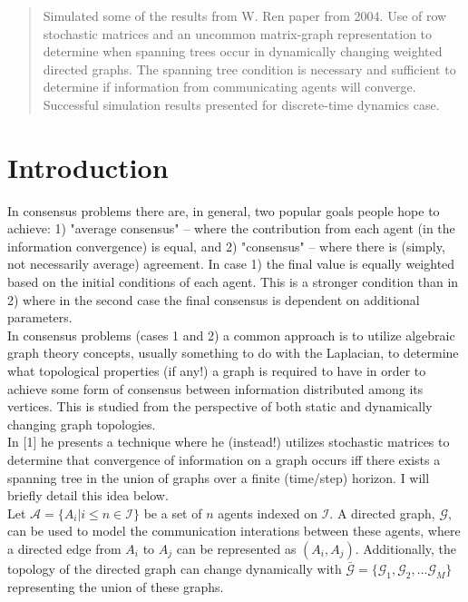 \documentclass[12pt]{article}
\begin{document}
\maketitle

\begin{abstract}
	Simulated some of the results from W. Ren paper from 2004. Use of row stochastic matrices and an uncommon matrix-graph representation to determine when spanning trees occur in dynamically changing weighted directed graphs. The spanning tree condition is necessary and sufficient to determine if information from communicating agents will converge. Successful simulation results presented for discrete-time dynamics case. 
\end{abstract}

\section{Introduction}
In consensus problems there are, in general, two popular goals people hope to achieve: 1) "average consensus" -- where the contribution from each agent (in the information convergence) is equal, and 2) "consensus" -- where there is (simply, not necessarily average) agreement. In case 1) the final value is equally weighted based on the initial conditions of each agent. This is a stronger condition than in 2) where in the second case the final consensus is dependent on additional parameters. \\

In consensus problems (cases 1 and 2) a common approach is to utilize algebraic graph theory concepts, usually something to do with the Laplacian, to determine what topological properties (if any!) a graph is required to have in order to achieve some form of consensus between information distributed among its vertices. This is studied from the perspective of both static and dynamically changing graph topologies. \\

In [1] he presents a technique where he (instead!) utilizes stochastic matrices to determine that convergence of information on a graph occurs iff there exists a spanning tree in the union of graphs over a finite (time/step) horizon. I will briefly detail this idea below. \\

Let $\mathcal{A} = \{A_{i} | i \leq n \in \mathcal{I} \}$ be a set of $n$ agents indexed on $\mathcal{I}$. A directed graph, $\mathcal{G}$, can be used to model the communication interations between these agents, where a directed edge from $A_{i}$ to $A_{j}$ can be represented as $(A_{i}, A_{j})$. Additionally, the topology of the directed graph can change dynamically with $\bar{\mathcal{G}} = \{ \mathcal{G}_{1}, \mathcal{G}_{2}, ... \mathcal{G}_{M} \}$ representing the union of these graphs. \\
\end{document}
